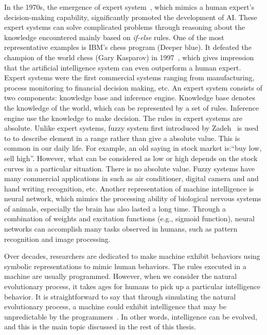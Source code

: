 In the 1970s, the emergence of expert system~\cite{Jackson1998}, which mimics a human expert's decision-making capability, significantly promoted the development of AI. These expert systems can solve complicated problems through reasoning about the knowledge encountered mainly based on \textit{if-else} rules. One of the most representative examples is IBM's chess program (Deeper blue). It defeated the champion of the world chess (Gary Kasparov) in 1997~\cite{Newborn1992}, which gives impression that the artificial intelligence system can even outperform a human expert. Expert systems were the first commercial systems ranging from manufacturing, process monitoring to financial decision making, etc. An expert system consists of two components: knowledge base and inference engine. Knowledge base denotes the knowledge of the world, which can be represented by a set of rules. Inference engine use the knowledge to make decision. The rules in expert systems are absolute. Unlike expert systems, fuzzy system first introduced by Zadeh~\cite{Zadeh:IC:1965} is used to to describe element in a range rather than give a absolute value. This is common in our daily life. For example, an old saying in stock market is:``buy low, sell high''. However, what can be considered as low or high depends on the stock curves in a particular situation. There is no absolute value. Fuzzy systems have many commercial applications in such as air conditioner, digital camera and and hand writing recognition, etc. Another representation of machine intelligence is neural network, which mimics the processing ability of biological nervous systems of animals, especially the brain has also lasted a long time. Through a combination of weights and excitation functions (e.g., sigmoid function), neural networks can accomplish many tasks observed in humans, such as pattern recognition and image processing. 

Over decades, researchers are dedicated to make machine exhibit behaviors using symbolic representations to mimic human behaviors. The rules executed in a machine are usually programmed. However, when we consider the natural evolutionary process, it takes ages for humans to pick up a particular intelligence behavior. It is straightforward to say that through simulating the natural evolutionary process, a machine could exhibit intelligence that may be unpredictable by the programmers~\cite{Fogel1995}. In other words, intelligence can be evolved, and this is the main topic discussed in the rest of this thesis. 

